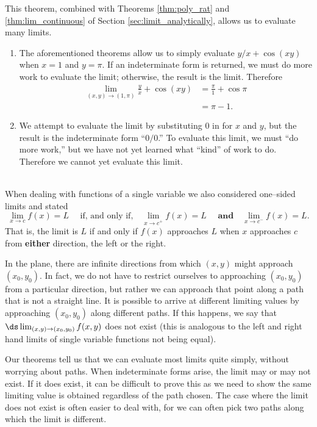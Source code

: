 This theorem, combined with Theorems \ref{thm:poly_rat} and \ref{thm:lim_continuous} of Section \ref{sec:limit_analytically}, allows us to evaluate many limits.\\

{\begin{enumerate}
	\item The aforementioned theorems allow us to simply evaluate $y/x+\cos(xy)$ when $x=1$ and $y=\pi$. If an indeterminate form is returned, we must do more work to evaluate the limit; otherwise, the result is the limit. Therefore
	\begin{align*}
	\lim_{(x,y)\to (1,\pi)} \frac yx + \cos(xy)  &= \frac\pi{1}+\cos \pi \\
		&= \pi -1.
	\end{align*}
	\item		We attempt to evaluate the limit by substituting 0 in for $x$ and $y$, but the result is the indeterminate form ``$0/0$.'' To evaluate this limit, we must ``do more work,'' but we have not yet learned what ``kind'' of work to do. Therefore we cannot yet evaluate this limit.
\end{enumerate}
\baselineskip
}\\

When dealing with functions of a single variable we also considered one--sided limits and stated
$$\lim_{x\to c}f(x) = L \quad\text{ if, and only if,}\quad \lim_{x\to c^+}f(x) =L \quad\textbf{ and}\quad \lim_{x\to c^-}f(x) =L.$$
That is, the limit is $L$ if and only if $f(x)$ approaches $L$ when $x$ approaches $c$ from \textbf{either} direction, the left or the right.

In the plane, there are infinite directions from which $(x,y)$ might approach $(x_0,y_0)$. In fact, we do not have to restrict ourselves to approaching $(x_0,y_0)$ from a particular direction, but rather we can approach that point along a path that is not a straight line. It is possible to arrive at different limiting values by approaching $(x_0,y_0)$ along different paths. If this happens, we say that $\ds \lim_{(x,y)\to(x_0,y_0) } f(x,y)$ does not exist (this is analogous to the left and right hand limits of single variable functions not being equal).

Our theorems tell us that we can evaluate most limits quite simply, without worrying about  paths. When indeterminate forms arise, the limit may or may not exist. If it does exist, it can be difficult to prove this as we need to show the same limiting value is obtained regardless of the path chosen. The case where the limit does not exist is often easier to deal with, for we can often pick two paths along which the limit is different.\\


